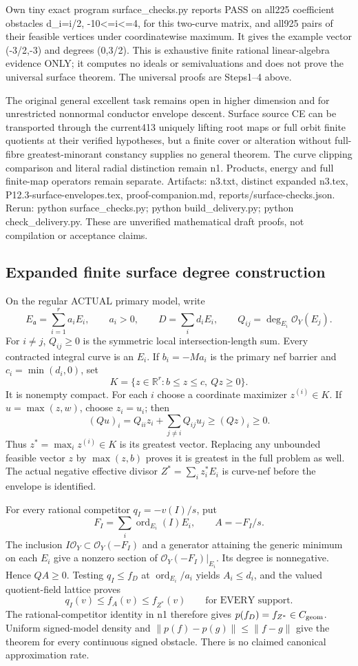 \documentclass[11pt]{article}
\begin{document}
Own tiny exact program surface\_checks.py reports PASS on all225 coefficient obstacles d\_i=i/2, -10<=i<=4, for this two-curve matrix, and all925 pairs of their feasible vertices under coordinatewise maximum. It gives the example vector (-3/2,-3) and degrees (0,3/2). This is exhaustive finite rational linear-algebra evidence ONLY; it computes no ideals or semivaluations and does not prove the universal surface theorem. The universal proofs are Steps1--4 above.

The original general excellent task remains open in higher dimension and for unrestricted nonnormal conductor envelope descent. Surface source CE can be transported through the current413 uniquely lifting root maps or full orbit finite quotients at their verified hypotheses, but a finite cover or alteration without full-fibre greatest-minorant constancy supplies no general theorem. The curve clipping comparison and literal radial distinction remain n1. Products, energy and full finite-map operators remain separate. Artifacts: n3.txt, distinct expanded n3.tex, P12.3-surface-envelopes.tex, proof-companion.md, reports/surface-checks.json. Rerun: python surface\_checks.py; python build\_delivery.py; python check\_delivery.py. These are unverified mathematical draft proofs, not compilation or acceptance claims.

\subsection*{Expanded finite surface degree construction}
On the regular ACTUAL primary model, write
\[
 E_{\mathfrak a}=\sum_{i=1}^r a_i E_i,\qquad a_i>0,
 \qquad D=\sum_i d_i E_i,\qquad
 Q_{ij}=\deg_{E_i}\mathcal O_Y(E_j).
\]
For $i\ne j$, $Q_{ij}\ge0$ is the symmetric local intersection-length
sum. Every contracted integral curve is an $E_i$. If
$b_i=-Ma_i$ is the primary nef barrier and $c_i=\min(d_i,0)$, set
\[
 K=\{z\in\mathbb R^r:b\le z\le c,\ Qz\ge0\}.
\]
It is nonempty compact. For each $i$ choose a coordinate maximizer
$z^{(i)}\in K$. If $u=\max(z,w)$, choose $z_i=u_i$; then
\[
 (Qu)_i=Q_{ii}z_i+\sum_{j\ne i}Q_{ij}u_j
 \ge (Qz)_i\ge0.
\]
Thus $z^*=\max_i z^{(i)}\in K$ is its greatest vector. Replacing any
unbounded feasible vector $z$ by $\max(z,b)$ proves it is greatest
in the full problem as well. The actual negative effective divisor
$Z^*=\sum_i z_i^*E_i$ is curve-nef before the envelope is identified.

For every rational competitor $q_I=-v(I)/s$, put
\[
 F_I=\sum_i\operatorname{ord}_{E_i}(I)E_i,\qquad A=-F_I/s.
\]
The inclusion $I\mathcal O_Y\subset\mathcal O_Y(-F_I)$ and a generator
attaining the generic minimum on each $E_i$ give a nonzero section of
$\mathcal O_Y(-F_I)|_{E_i}$. Its degree is nonnegative. Hence $QA\ge0$.
Testing $q_I\le f_D$ at $\operatorname{ord}_{E_i}/a_i$ yields
$A_i\le d_i$, and the valued quotient-field lattice proves
\[
 q_I(v)\le f_A(v)\le f_{Z^*}(v)\qquad\text{for EVERY support}.
\]
The rational-competitor identity in n1 therefore gives
$p(f_D)=f_{Z^*}\in C_{\rm geom}$. Uniform signed-model density and
$\|p(f)-p(g)\|\le\|f-g\|$ give the theorem for every continuous signed
obstacle. There is no claimed canonical approximation rate.
\end{document}
